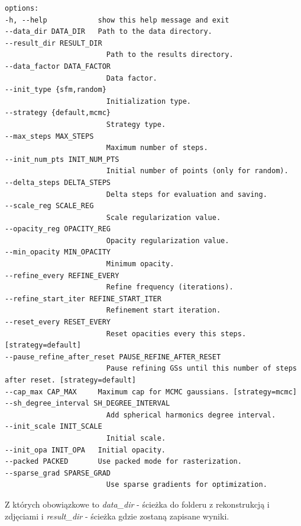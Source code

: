 \lstset{style=basicstyle}
\begin{lstlisting}[language=SHELXL] 
options:
-h, --help            show this help message and exit
--data_dir DATA_DIR   Path to the data directory.
--result_dir RESULT_DIR
                        Path to the results directory.
--data_factor DATA_FACTOR
                        Data factor.
--init_type {sfm,random}
                        Initialization type.
--strategy {default,mcmc}
                        Strategy type.
--max_steps MAX_STEPS
                        Maximum number of steps.
--init_num_pts INIT_NUM_PTS
                        Initial number of points (only for random).
--delta_steps DELTA_STEPS
                        Delta steps for evaluation and saving.
--scale_reg SCALE_REG
                        Scale regularization value.
--opacity_reg OPACITY_REG
                        Opacity regularization value.
--min_opacity MIN_OPACITY
                        Minimum opacity.
--refine_every REFINE_EVERY
                        Refine frequency (iterations).
--refine_start_iter REFINE_START_ITER
                        Refinement start iteration.
--reset_every RESET_EVERY
                        Reset opacities every this steps. [strategy=default]
--pause_refine_after_reset PAUSE_REFINE_AFTER_RESET
                        Pause refining GSs until this number of steps after reset. [strategy=default]
--cap_max CAP_MAX     Maximum cap for MCMC gaussians. [strategy=mcmc]
--sh_degree_interval SH_DEGREE_INTERVAL
                        Add spherical harmonics degree interval.
--init_scale INIT_SCALE
                        Initial scale.
--init_opa INIT_OPA   Initial opacity.
--packed PACKED       Use packed mode for rasterization.
--sparse_grad SPARSE_GRAD
                        Use sparse gradients for optimization.

\end{lstlisting}

\lstset{style=pythonstyle}

Z których obowiązkowe to \textit{data\_dir} - ścieżka do folderu z rekonstrukcją i zdjęciami i \textit{result\_dir} - ścieżka gdzie zostaną zapisane wyniki. 

